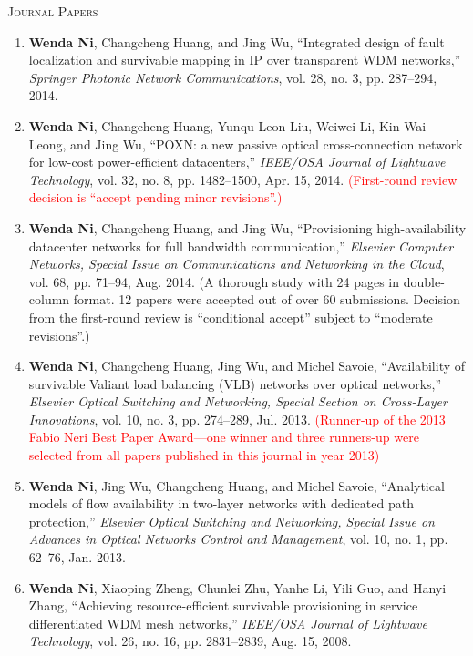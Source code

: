 \documentclass[letterpaper,11pt]{article}
\newcommand{\resheading}[1]{{\noindent\large \colorbox{mygrey}{
\begin{minipage}{1.0\textwidth}{\textsc{#1 \vphantom{p\^{E}}}}\end{minipage}}}}
\begin{document}
\resheading{Journal Papers}%
\begin{enumerate}

\item
\textbf{Wenda Ni}, Changcheng Huang, and Jing Wu, ``Integrated design of fault localization and survivable mapping in IP over transparent WDM networks,'' \textit{Springer Photonic Network Communications}, vol. 28, no. 3, pp. 287--294, 2014.

\item
\textbf{Wenda Ni}, Changcheng Huang, Yunqu Leon Liu, Weiwei Li, Kin-Wai Leong, and Jing Wu, ``POXN: a new passive optical cross-connection network for low-cost power-efficient datacenters,'' \textit{IEEE/OSA Journal of Lightwave Technology}, vol. 32, no. 8, pp. 1482--1500, Apr. 15, 2014.
\textcolor{Red}{(First-round review decision is ``accept pending minor revisions''.)}

\item
\textbf{Wenda Ni}, Changcheng Huang, and Jing Wu, ``Provisioning high-availability datacenter networks for full bandwidth communication,'' \textit{Elsevier Computer Networks, Special Issue on Communications and Networking in the Cloud}, vol. 68, pp. 71--94, Aug. 2014.
(A thorough study with 24 pages in double-column format. 12 papers were accepted out of over 60 submissions. Decision from the first-round review is ``conditional accept'' subject to ``moderate revisions''.)

\item
\textbf{Wenda Ni}, Changcheng Huang, Jing Wu, and Michel Savoie, ``Availability of survivable Valiant load balancing (VLB) networks over optical networks,'' \textit{Elsevier Optical Switching and Networking, Special Section on Cross-Layer Innovations}, vol. 10, no. 3, pp. 274--289, Jul. 2013. \textcolor{Red}{(Runner-up of the 2013 Fabio Neri Best Paper Award---one winner and three runners-up were selected from all papers published in this journal in year 2013)}

\item
\textbf{Wenda Ni}, Jing Wu, Changcheng Huang, and Michel Savoie, ``Analytical models of flow availability in two-layer networks with dedicated path protection,'' \textit{Elsevier Optical Switching and Networking, Special Issue on Advances in Optical Networks Control and Management}, vol. 10, no. 1, pp. 62--76, Jan. 2013.

\item
\textbf{Wenda Ni}, Xiaoping Zheng, Chunlei Zhu, Yanhe Li, Yili Guo, and Hanyi Zhang, ``Achieving resource-efficient survivable provisioning in service differentiated WDM mesh networks,'' \textit{IEEE/OSA Journal of Lightwave Technology}, vol. 26, no. 16, pp. 2831--2839, Aug. 15, 2008.


\end{enumerate}
\end{document}
